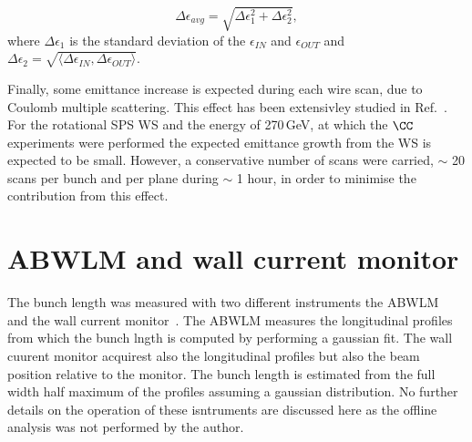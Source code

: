 \begin{equation}\label{eq:avg+emittance_from_WS_uncertainty}
   \Delta \epsilon_{avg} = \sqrt{\Delta \epsilon_1 ^2 + \Delta \epsilon_2 ^2},
\end{equation}
where $\Delta \epsilon_1$ is the standard deviation of the $\epsilon_{IN}$ and $\epsilon_{OUT}$ and $\Delta \epsilon_2=\sqrt{\langle \Delta \epsilon_{IN}, \Delta \epsilon_{OUT}\rangle}$.


Finally, some emittance increase is expected during each wire scan, due to Coulomb multiple scattering. This effect has been extensivley studied in Ref.~\cite{Roncarolo:1481835}. For the rotational SPS WS and the energy of 270\,GeV, at which the $\CC$ experiments were performed the expected emittance growth from the WS is expected to be small. However, a conservative number of scans were carried, $\sim$ 20 scans per bunch and per plane during $\sim$ 1 hour, in order to minimise the contribution from this effect.

\section{ABWLM and wall current monitor}\label{sec:ABWLM_WallCurrentMonitor}

\begin{sloppypar}
The bunch length was measured with two different instruments the ABWLM~\cite{ABWLM} and the wall current monitor~\cite{Papotti:1124099}. The ABWLM measures the longitudinal profiles from which the bunch lngth is computed by performing a gaussian fit. The wall cuurent monitor acquirest also the longitudinal profiles but also the beam position relative to the monitor. The bunch length is estimated from the full width half maximum of the profiles assuming a gaussian distribution. No further details on the operation of these isntruments are discussed here as the offline analysis was not performed by the author.
\end{sloppypar}



